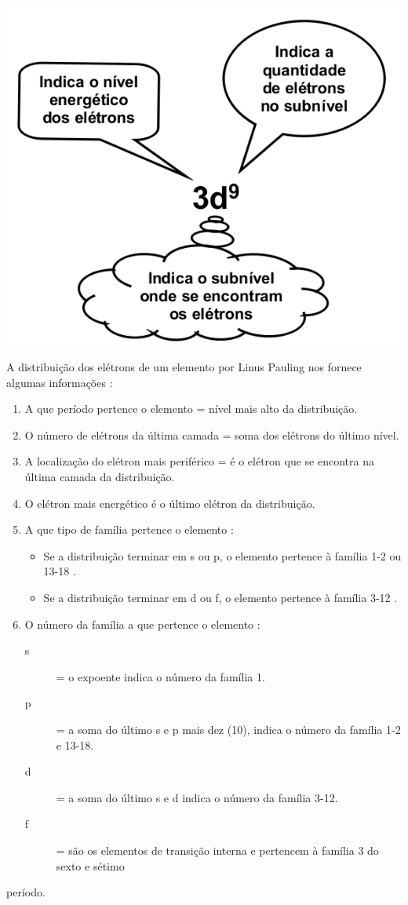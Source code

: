 \documentclass[10pt]{scrartcl}
\begin{document}
 \includegraphics[scale=.3]{Quimica-Geral-Aula/subnivel.png}

A distribuição dos elétrons de um elemento por Linus Pauling nos fornece algumas informações :

\begin{enumerate}
\item A que período pertence o elemento = nível mais alto da distribuição.
\item O número de elétrons da última camada = soma dos elétrons do último nível.
\item A localização do elétron mais periférico = é o elétron que se encontra na última camada da distribuição.
\item O elétron mais energético é o último elétron da distribuição.
\item A que tipo de família pertence o elemento :
\begin{itemize}
\item Se a distribuição terminar em s ou p, o elemento pertence à família 1-2 ou 13-18 .
\item Se a distribuição terminar em d ou f, o elemento pertence à família 3-12 .
\end{itemize}
\item O número da família a que pertence o elemento :
\begin{description}
\item[{s}] = o expoente indica o número da família 1.
\item[{p}] = a soma do último s e p mais dez (10), indica o número da família 1-2 e 13-18.
\item[{d}] = a soma do último s e d indica o número da família 3-12.
\item[{f}] = são os elementos de transição interna e pertencem à família 3 do sexto e sétimo
\end{description}
\end{enumerate}
período.
\end{document}
